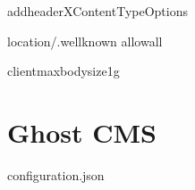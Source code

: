 \documentclass[letterpaper,10pt,english]{sphinxmanual}
\begin{document}
\begin{sphinxVerbatim}[commandchars=\\\{\}]
add\PYGZus{}headerX\PYGZhy{}Content\PYGZhy{}Type\PYGZhy{}Options

location\PYGZti{}/.well\PYGZhy{}known
allowall

client\PYGZus{}max\PYGZus{}body\PYGZus{}size1g
\end{sphinxVerbatim}


\section{Ghost CMS}
\label{\detokenize{configurations:ghost-cms}}
\sphinxAtStartPar
configuration.json
\end{document}
